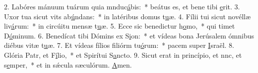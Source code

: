 2. Labóres mánuum tuárum quia mnduc\uline{á}bis:~* beátus es, et bene tibi \uline{e}rit.
3. Uxor tua sicut vits ab\uline{ú}ndans:~* in latéribus domus t\uline{u}æ.
4. Fílii tui sicut novéllæ liv\uline{á}rum:~* in circúitu mensæ t\uline{u}æ.
5. Ecce sic benedictur h\uline{o}mo,~* qui timet D\uline{ó}minum.
6. Benedícat tibi Dómins ex S\uline{i}on:~* et vídeas bona Jerúsalem ómnibus diébus vitæ t\uline{u}æ.
7. Et vídeas fílios filiórm tu\uline{ó}rum:~* pacem super \uline{I}sraël.
8. Glória Patr, et F\uline{í}lio,~* et Spirítui S\uline{a}ncto.
9. Sicut erat in princípio, et nnc, et s\uline{e}mper,~* et in sǽcula sæculórum. \uline{A}men.
